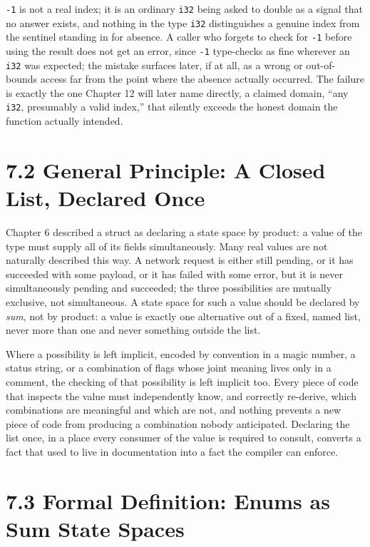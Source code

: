 \documentclass[11pt]{book}
\begin{document}
\texttt{-1} is not a real index; it is an ordinary \texttt{i32} being asked to double as a signal that no answer exists, and nothing in the type \texttt{i32} distinguishes a genuine index from the sentinel standing in for absence. A caller who forgets to check for \texttt{-1} before using the result does not get an error, since \texttt{-1} type-checks as fine wherever an \texttt{i32} was expected; the mistake surfaces later, if at all, as a wrong or out-of-bounds access far from the point where the absence actually occurred. The failure is exactly the one Chapter 12 will later name directly, a claimed domain, ``any \texttt{i32}, presumably a valid index,'' that silently exceeds the honest domain the function actually intended.

\section*{7.2 General Principle: A Closed List, Declared Once}

Chapter 6 described a struct as declaring a state space by product: a value of the type must supply all of its fields simultaneously. Many real values are not naturally described this way. A network request is either still pending, or it has succeeded with some payload, or it has failed with some error, but it is never simultaneously pending and succeeded; the three possibilities are mutually exclusive, not simultaneous. A state space for such a value should be declared by \emph{sum}, not by product: a value is exactly one alternative out of a fixed, named list, never more than one and never something outside the list.

Where a possibility is left implicit, encoded by convention in a magic number, a status string, or a combination of flags whose joint meaning lives only in a comment, the checking of that possibility is left implicit too. Every piece of code that inspects the value must independently know, and correctly re-derive, which combinations are meaningful and which are not, and nothing prevents a new piece of code from producing a combination nobody anticipated. Declaring the list once, in a place every consumer of the value is required to consult, converts a fact that used to live in documentation into a fact the compiler can enforce.

\section*{7.3 Formal Definition: Enums as Sum State Spaces}
\end{document}

